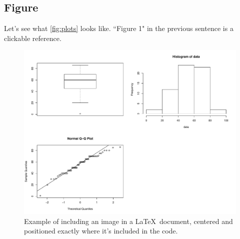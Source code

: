 \documentclass[a4paper]{article}
\begin{document}
	\subsection{Figure}
	Let's see what \autoref{fig:plots} looks like. ``Figure 1" in the previous sentence is a clickable reference.
	\begin{figure}[H]
		\centering
		\captionsetup{justification=centering}
		\includegraphics[scale=0.2]{assets/plots}
		\caption{Example of including an image in a \LaTeX\ document, centered and positioned exactly where it's included in the code.\label{fig:plots}}
	\end{figure}
\end{document}
